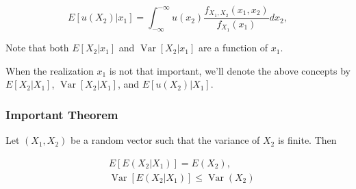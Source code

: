 \documentclass{article}
\begin{document}
                \begin{equation*}
                    E[u(X_{2}) | x_{1}] = \int_{-\infty}^{-\infty} u(x_{2}) \frac{
                     f_{X_{1}, X_{2}}(x_{1}, x_{2}) }{ f_{X_{1}}( x_{1}) } d x_{2},
                \end{equation*}

                Note that both $ E[X_{2} | x_{1}] $ and $ \operatorname{Var}[X_{2} | x_{1}] $
                are a function of $ x_{1} $.

                When the realization $ x_{1} $ is not that important, we'll denote the above concepts by
                $ E[X_{2}|X_{1}] $, $ \operatorname{Var}[X_{2}|X_{1}] $, and $ E[u(X_{2})|X_{1}] $.

                \subsubsection{Important Theorem}

                    Let $ ( X_{1}, X_{2} ) $ be a random vector such that the variance of $ X_{2} $ is finite. Then

                    \begin{align*}
                        & E[E(X_{2}|X_{1})] = E(X_{2}),\\
                        & \operatorname{Var}[E(X_{2}|X_{1})] \leq \operatorname{Var}(X_{2})
                    \end{align*}
\end{document}
